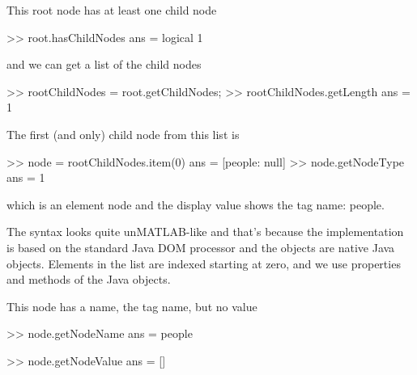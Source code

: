 This root node has at least one child node
\begin{Code}
>> root.hasChildNodes
ans =  logical
   1
\end{Code}
and we can get a list of the child nodes
\begin{Code}
>> rootChildNodes = root.getChildNodes;
>> rootChildNodes.getLength
ans =
     1
\end{Code}
The first (and only) child node from this list is
\begin{Code}
>> node = rootChildNodes.item(0)
ans =
[people: null]
>> node.getNodeType
ans =
     1
\end{Code}
which is an element node and the display value shows the tag name: people.

The syntax looks quite unMATLAB-like and that's because the implementation is based on the standard Java DOM processor and the objects are native Java objects.  Elements in the list are indexed starting at zero, and we use properties and methods of the Java objects.

This node has a name, the tag name, but no value
\begin{Code}
>> node.getNodeName
ans =
people

>> node.getNodeValue
ans =
     []
\end{Code}

